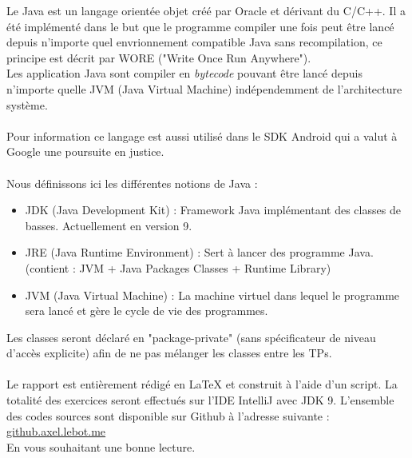 \documentclass[12pt,a4paper]{book} %
\begin{document}
Le Java est un langage orientée objet créé par Oracle et dérivant du C/C++. Il a été implémenté dans le but que le programme compiler une fois peut être lancé depuis n'importe quel envrionnement compatible Java sans recompilation, ce principe est décrit par WORE ("Write Once Run Anywhere").\\
Les application Java sont compiler en \textit{bytecode} pouvant être lancé depuis n'importe quelle JVM (Java Virtual Machine) indépendemment de l'architecture système.
\\\\
Pour information ce langage est aussi utilisé dans le SDK Android qui a valut à Google une poursuite en justice.
\\\\
Nous définissons ici les différentes notions de Java :
\begin{itemize}
  \item JDK (Java Development Kit) : Framework Java implémentant des classes de basses. Actuellement en version 9.
  \item JRE (Java Runtime Environment) : Sert à lancer des programme Java. (contient : JVM + Java Packages Classes + Runtime Library)
  \item JVM (Java Virtual Machine) : La machine virtuel dans lequel le programme sera lancé et gère le cycle de vie des programmes.
\end{itemize}

Les classes seront déclaré en "package-private" (sans spécificateur de niveau d'accès explicite) afin de ne pas mélanger les classes entre les TPs.
\\\\
Le rapport est entièrement rédigé en LaTeX et construit à l'aide d'un script. La totalité des exercices seront effectués sur l'IDE IntelliJ avec JDK 9. L'ensemble des codes sources sont disponible sur Github à l'adresse suivante : \href{http://github.axel.lebot.me}{github.axel.lebot.me}
\\
En vous souhaitant une bonne lecture.

\cleardoublepage %

\pagestyle{fancy} %

\end{document}
